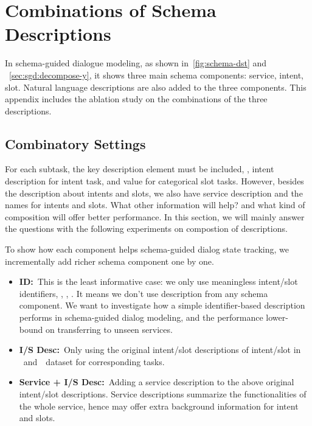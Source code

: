 \chapter[Combinations of Schema Descriptions]{Combinations of
  Schema Descriptions}
\label{chap:appendix:schema}
In schema-guided dialogue modeling, as shown
in~\autoref{fig:schema-dst} and ~\autoref{sec:sgd:decompose-y}, it
shows three main schema components: service, intent, slot. Natural
language descriptions are also added to the three components. This
appendix includes the ablation study on the combinations of the three
descriptions.

\section{Combinatory Settings}
\label{sec:sgd:com-desc}
For each subtask, the key description element must be included, \eg,
intent description for intent task, and value for categorical slot
tasks. However, besides the description about intents and slots, we
also have service description and the names for intents and
slots. What other information will help? and what kind of composition
will offer better performance. In this section, we will mainly answer
the questions with the following experiments on compostion of
descriptions.

To show how each component helps schema-guided dialog state tracking,
we incrementally add richer schema component one by one.

\begin{itemize}
\item \textbf{ID:}~This is the least informative case: we only use
  meaningless intent/slot identifiers, \eg, , . It means we don't use
  description from any schema component. We want to investigate how a
  simple identifier-based description performs in schema-guided dialog
  modeling, and the performance lower-bound on transferring to unseen services.

\item \textbf{I/S Desc:}~Only using the original intent/slot descriptions
  of intent/slot in \sgdst~and~\multiwoz~dataset for corresponding
  tasks.

\item \textbf{Service + I/S Desc:}~Adding a service description to the above
  original intent/slot descriptions. Service descriptions summarize the
  functionalities of the whole service, hence may offer extra background
  information for intent and slots.
\end{itemize}

